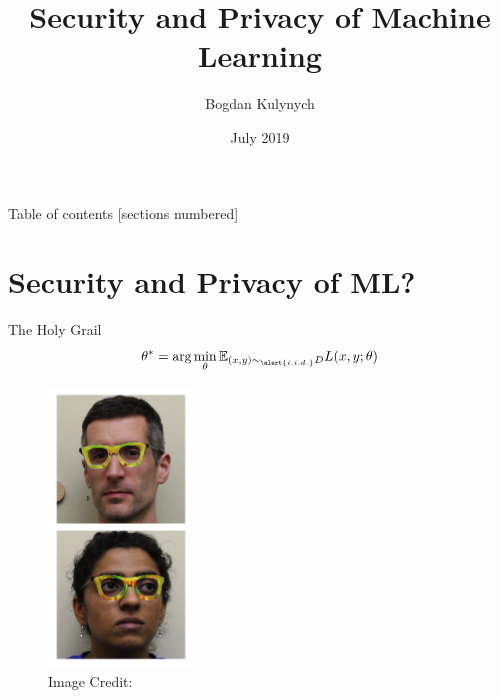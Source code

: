 \documentclass[10pt]{beamer}
\title{Security and Privacy of Machine Learning}
\date{July 2019}
\author{Bogdan Kulynych}
\begin{document}
\maketitle



\begin{frame}{Table of contents}
  [sections numbered]
  \tableofcontents[hideallsubsections]
\end{frame}

\section{Security and Privacy of ML?}

\begin{frame}[fragile]{The Holy Grail}
  \[
      \theta^* = \arg \min_\theta \mathbb{E}_{(x, y) \sim_{\alert{i.i.d.}} D} L(x, y; \theta)
  \]
\end{frame}

\begin{frame}[fragile]{}
  \begin{figure}
  \centering
  \includegraphics[width=1.5in]{glasses_intro.png} \\
  \footnotesize Image Credit: \cite{SharifBBR16}
  \end{figure}
\end{frame}
\end{document}
